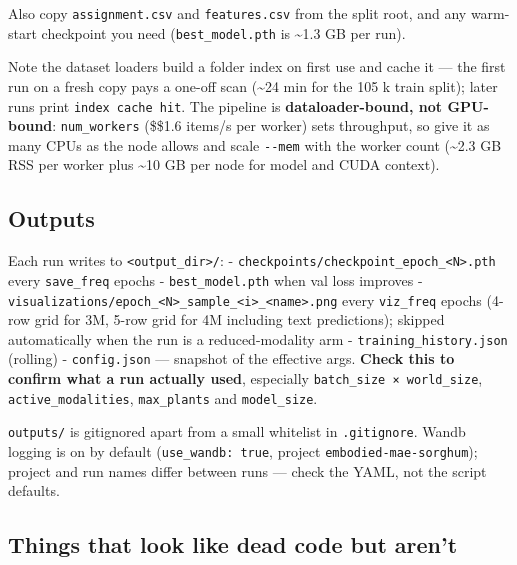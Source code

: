 \documentclass[
  10pt,
]{article}
\begin{document}
Also copy \texttt{assignment.csv} and \texttt{features.csv} from the
split root, and any warm-start checkpoint you need
(\texttt{best\_model.pth} is \textasciitilde1.3 GB per run).

Note the dataset loaders build a folder index on first use and cache it
--- the first run on a fresh copy pays a one-off scan (\textasciitilde24
min for the 105 k train split); later runs print
\texttt{index\ cache\ hit}. The pipeline is \textbf{dataloader-bound,
not GPU-bound}: \texttt{num\_workers} (\$\approx\$1.6 items/s per
worker) sets throughput, so give it as many CPUs as the node allows and
scale \texttt{-\/-mem} with the worker count (\textasciitilde2.3 GB RSS
per worker plus \textasciitilde10 GB per node for model and CUDA
context).

\subsection{Outputs}\label{outputs}

Each run writes to \texttt{\textless{}output\_dir\textgreater{}/}: -
\texttt{checkpoints/checkpoint\_epoch\_\textless{}N\textgreater{}.pth}
every \texttt{save\_freq} epochs - \texttt{best\_model.pth} when val
loss improves -
\texttt{visualizations/epoch\_\textless{}N\textgreater{}\_sample\_\textless{}i\textgreater{}\_\textless{}name\textgreater{}.png}
every \texttt{viz\_freq} epochs (4-row grid for 3M, 5-row grid for 4M
including text predictions); skipped automatically when the run is a
reduced-modality arm - \texttt{training\_history.json} (rolling) -
\texttt{config.json} --- snapshot of the effective args. \textbf{Check
this to confirm what a run actually used}, especially
\texttt{batch\_size\ ×\ world\_size}, \texttt{active\_modalities},
\texttt{max\_plants} and \texttt{model\_size}.

\texttt{outputs/} is gitignored apart from a small whitelist in
\texttt{.gitignore}. Wandb logging is on by default
(\texttt{use\_wandb:\ true}, project \texttt{embodied-mae-sorghum});
project and run names differ between runs --- check the YAML, not the
script defaults.

\subsection{Things that look like dead code but
aren't}\label{things-that-look-like-dead-code-but-arent}
\end{document}
